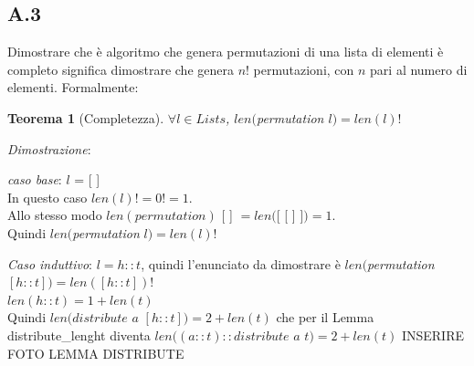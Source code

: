 \documentclass[a4paper]{article}
\newtheorem*{theorem}{Teorema}
\newenvironment{dimostrazione}{\textit{Dimostrazione}:\begin{adjustwidth}{1cm}{}}{\end{adjustwidth}}
\begin{document}
\subsection{A.3}
Dimostrare che è algoritmo che genera permutazioni di una lista di elementi è completo significa dimostrare che genera $n!$ permutazioni, con $n$ pari al numero di elementi. Formalmente:
\begin{theorem}[Completezza] $\forall l \in Lists$, $len($\textit{permutation} $l) = len(l)!$\end{theorem}
\begin{dimostrazione}
	\textit{caso base}: $l$ = [ ]\\
	In questo caso $len(l)! = 0! = 1$.\\
	Allo stesso modo $len(permutation)$ [ ] $= len($[ [ ] ]$) = 1$.\\
	Quindi $len($\textit{permutation} $l) = len(l)!$
	
	\textit{Caso induttivo}: $l = h::t$, quindi l'enunciato da dimostrare è $len($\textit{permutation} $[h::t]) = len([h::t])!$\\
	$len(h::t) = 1 + len(t)$\\
	Quindi $len(distribute$ $a$ $[h::t]) = 2 + len(t)$ che per il Lemma distribute\_lenght diventa $len((a::t)::distribute$ $a$ $t) = 2 + len(t)$
	INSERIRE FOTO LEMMA DISTRIBUTE
\end{dimostrazione}
\end{document}
